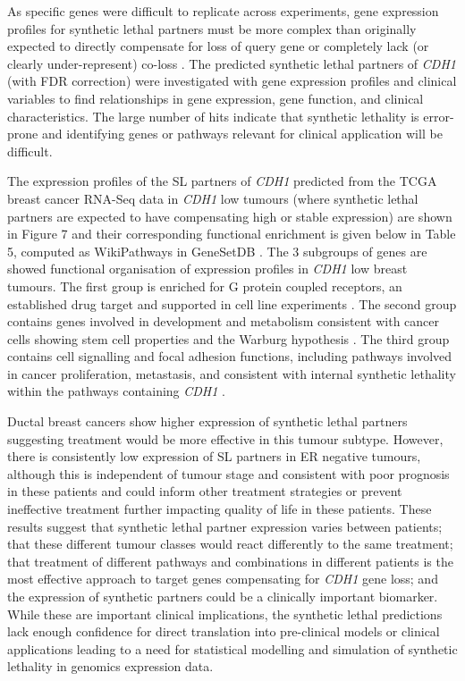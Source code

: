 As specific genes were difficult to replicate across experiments, gene expression profiles for synthetic lethal partners must be more complex than originally expected to directly compensate for loss of query gene or completely lack (or clearly under-represent) co-loss \citep{Kelly2013, Jerby2014, Lu2015}.  The predicted synthetic lethal partners of \textit{CDH1} (with FDR correction) were investigated with gene expression profiles and clinical variables to find relationships in gene expression, gene function, and clinical characteristics.  The large number of hits indicate that synthetic lethality is error-prone and identifying genes or pathways relevant for clinical application will be difficult.

The expression profiles of the SL partners of \textit{CDH1} predicted from the TCGA breast cancer RNA-Seq data in \textit{CDH1} low tumours (where synthetic lethal partners are expected to have compensating high or stable expression) are shown in Figure 7 and their corresponding functional enrichment is given below in Table 5, computed as WikiPathways in GeneSetDB \citep{genesetdb}.  The 3 subgroups of genes are showed functional organisation of expression profiles in \textit{CDH1} low breast tumours.  The first group is enriched for G protein coupled receptors, an established drug target and supported in cell line experiments \citep{Telford2015}.  The second group contains genes involved in development and metabolism consistent with cancer cells showing stem cell properties and the Warburg hypothesis \citep{Merlos-Suarez2011, Warburg1956}.  The third group contains cell signalling and focal adhesion functions, including pathways involved in cancer proliferation, metastasis, and consistent with internal synthetic lethality within the pathways containing \textit{CDH1} \citep{Barabasi2004}.

Ductal breast cancers show higher expression of synthetic lethal partners suggesting treatment would be more effective in this tumour subtype.  However, there is consistently low expression of SL partners in ER negative tumours, although this is independent of tumour stage and consistent with poor prognosis in these patients and could inform other treatment strategies or prevent ineffective treatment further impacting quality of life in these patients.  These results suggest that synthetic lethal partner expression varies between patients; that these different tumour classes would react differently to the same treatment; that treatment of different pathways and combinations in different patients is the most effective approach to target genes compensating for \textit{CDH1} gene loss; and the expression of synthetic partners could be a clinically important biomarker.  While these are important clinical implications, the synthetic lethal predictions lack enough confidence for direct translation into pre-clinical models or clinical applications leading to a need for statistical modelling and simulation of synthetic lethality in genomics expression data.

